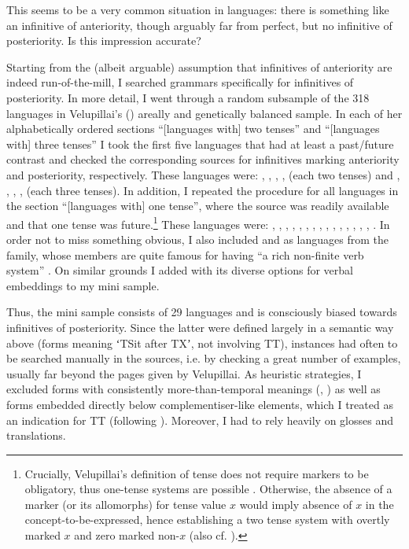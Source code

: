 \documentclass[output=paper,hidelinks]{langscibook}
\begin{document}
This seems to be a very common situation in languages: there is something like an infinitive of anteriority, though arguably far from perfect, but no infinitive of posteriority. Is this impression accurate?

Starting from the (albeit arguable) assumption that infinitives of anteriority are indeed run-of-the-mill, I searched grammars specifically for infinitives of posteriority. In more detail, I went through a random subsample of the 318 languages in Velupillai's (\citeyear{Velupillai2016}) areally and genetically balanced sample. In each of her alphabetically ordered sections “[languages with] two tenses” and “[languages with] three tenses” I took the first five languages that had at least a past/future contrast and checked the corresponding sources for infinitives marking anteriority and posteriority, respectively. These languages were: , , , ,  (each two tenses) and , , , ,  (each three tenses). In addition, I repeated the procedure for all languages in the section “[languages with] one tense”, where the source was readily available and that one tense was future.\footnote{Crucially, Velupillai’s definition of tense does not require markers to be obligatory, thus one-tense systems are possible \citep[94–95; 117]{Velupillai2016}. Otherwise, the absence of a marker (or its allomorphs) for tense value $x$ would imply absence of $x$ in the concept-to-be-expressed, hence establishing a two tense system with overtly marked $x$ and zero marked non-$x$ (also cf. \citealt[33–34]{Bybee1997}).} These languages were: , , , , , ,  , , , , , , , , , . In order not to miss something obvious, I also included  \citep{Norvik2015} and  \citep{Alhoniemi1993} as languages from the  family, whose members are quite famous for having “a rich non-finite verb system” \citep{RossHeeteTamm2010}. On similar grounds I added  with its diverse options for verbal embeddings \citep{Kornfilt2007} to my mini sample.

Thus, the mini sample consists of 29 languages and is consciously biased towards infinitives of posteriority. Since the latter were defined largely in a semantic way above (forms meaning ʻTSit after TXʼ, not involving TT), instances had often to be searched manually in the sources, i.e. by checking a great number of examples, usually far beyond the pages given by Velupillai. As heuristic strategies, I excluded forms with consistently more-than-temporal meanings (\citealt[10]{Dahl1985}, \citealt[23]{Dahl1985}) as well as forms embedded directly below complementiser-like elements, which I treated as an indication for TT (following \citealt[219–220]{Klein1994}). Moreover, I had to rely heavily on glosses and translations.
\end{document}
